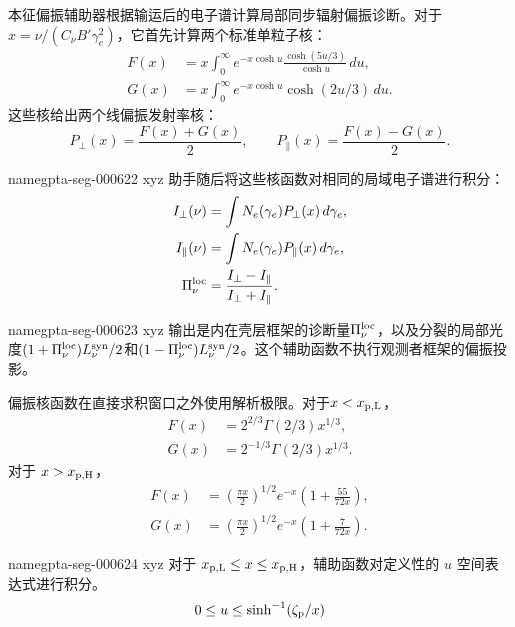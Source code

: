 \documentclass[twocolumn]{aastex702}
\makeatletter
\providecommand{\gptareaderanchor}[1]{\pdfdest name{#1} xyz}%
\providecommand{\gptareaderanchor}[1]{\special{pdf:dest (#1) [ @thispage /XYZ @xpos @ypos null ]}}%
\makeatother
\begin{document}
本征偏振辅助器根据输运后的电子谱计算局部同步辐射偏振诊断。对于 \(x=\nu/(C_\nu B'\gamma_e^2)\)，它首先计算两个标准单粒子核：
\begin{equation}
\begin{aligned}
F(x)&=x\int_0^\infty
e^{-x\cosh u}\frac{\cosh(5u/3)}{\cosh u}\,du,\\
G(x)&=x\int_0^\infty e^{-x\cosh u}\cosh(2u/3)\,du .
\end{aligned}
\end{equation}
这些核给出两个线偏振发射率核：
\[
P_\perp(x)=\frac{F(x)+G(x)}{2},\qquad
P_\parallel(x)=\frac{F(x)-G(x)}{2}.
\]

\gptareaderanchor{gpta-seg-000622}%
助手随后将这些核函数对相同的局域电子谱进行积分：
\begin{equation}
\begin{aligned}
I_\perp(\nu)&=\int N_e(\gamma_e)P_\perp(x)\,d\gamma_e,\\
I_\parallel(\nu)&=\int N_e(\gamma_e)P_\parallel(x)\,d\gamma_e,\\
\Pi_\nu^{\rm loc}&=\frac{I_\perp-I_\parallel}{I_\perp+I_\parallel}.
\end{aligned}
\end{equation}

\gptareaderanchor{gpta-seg-000623}%
输出是内在壳层框架的诊断量\(\Pi_\nu^{\rm loc}\)，以及分裂的局部光度\((1+\Pi_\nu^{\rm loc})L_\nu^{\rm syn}/2\)和\((1-\Pi_\nu^{\rm loc})L_\nu^{\rm syn}/2\)。这个辅助函数不执行观测者框架的偏振投影。

偏振核函数在直接求积窗口之外使用解析极限。对于\(x<x_{\rm p,L}\)，
\begin{equation}
\begin{aligned}
F(x)&=2^{2/3}\Gamma(2/3)x^{1/3},\\
G(x)&=2^{-1/3}\Gamma(2/3)x^{1/3}.
\end{aligned}
\end{equation}
对于 \(x>x_{\rm p,H}\)，
\begin{equation}
\begin{aligned}
F(x)&=\left(\frac{\pi x}{2}\right)^{1/2}e^{-x}
\left(1+\frac{55}{72x}\right),\\
G(x)&=\left(\frac{\pi x}{2}\right)^{1/2}e^{-x}
\left(1+\frac{7}{72x}\right).
\end{aligned}
\end{equation}

\gptareaderanchor{gpta-seg-000624}%
对于 \(x_{\rm p,L}\le x\le x_{\rm p,H}\)，辅助函数对定义性的 \(u\) 空间表达式进行积分。
\[
0\le u\le \sinh^{-1}(\zeta_{\rm p}/x)
\]
\end{document}
